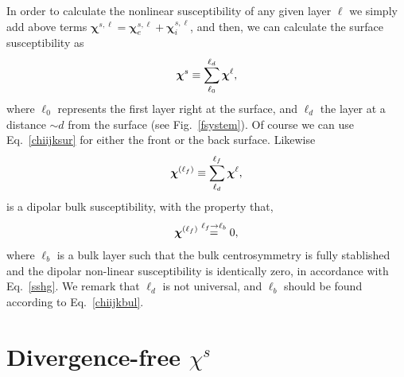 \documentclass{article}
\begin{document}
In order to calculate
the nonlinear susceptibility of any given layer $\ell$ we simply add above terms
$\boldsymbol{\chi}^{s,\ell}=\boldsymbol{\chi}_e^{s,\ell}+\boldsymbol{\chi}_i^{s,\ell}$, 
and 
then,
we can calculate the surface
susceptibility as 
\begin{equation}\label{chiijksur}
\boldsymbol{\chi}^s\equiv \sum_{\ell_0}^{\ell_d}\boldsymbol{\chi}^{\ell},
\end{equation}
where $\ell_0$ represents the first  layer right at the surface, and $\ell_d$ the
layer at a distance $\sim d$ from the surface (see
Fig.~\ref{fsystem}). Of course we can use Eq.~\eqref{chiijksur} for
either the front or the back surface.
Likewise
\begin{equation}\label{chiijklf}
\boldsymbol{\chi}^{(\ell_f)}\equiv \sum_{\ell_d}^{\ell_f}\boldsymbol{\chi}^{\ell},
\end{equation}
is a dipolar bulk susceptibility, with the property that,
\begin{equation}\label{chiijkbul}
\boldsymbol{\chi}^{(\ell_f)}\stackrel{\ell_f \to \ell_b}{=} 0,
\end{equation}
where $\ell_b$ is a bulk layer such that the bulk centrosymmetry is
fully stablished and the dipolar non-linear susceptibility is
identically zero, in accordance with Eq.~\eqref{sshg}. We remark that 
$\ell_d$  is
not universal, and $\ell_b$ should be found according to Eq.~\eqref{chiijkbul}. 

\section{Divergence-free $\chi^s$}
\end{document}
